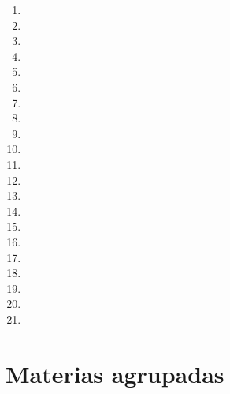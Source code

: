 \begin{appendices}
\begin{enumerate}
  \item 
  
  \item 
  
  \item 
  
  \item 
  
  \item 
  
  \item 
  
  \item 
  
  \item 
  
  \item 
  
  \item 
  
  \item 
  
  \item 
  
  \item 
  
  \item 
  
  \item 
  
  \item 
  
  \item 
  
  \item 
  
  \item 
  
  \item 
  
  \item 
\end{enumerate}



\chapter{Materias agrupadas}\label{materias_agrupadas}


\end{appendices}
